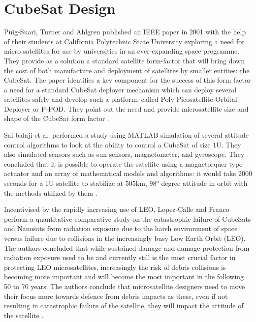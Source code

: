 \section{CubeSat Design}
Puig-Suari, Turner and Ahlgren published an IEEE paper in 2001 with the help of their students at California Polytechnic State University exploring a need for micro satellites for use by universities in an ever-expanding space programme. 
They provide as a solution a standard satellite form-factor that will bring down the cost of both manufacture and deployment of satellites by smaller entities: the CubeSat. 
The paper identifies a key component for the success of this form factor a need for a standard CubeSat deployer mechanism which can deploy several satellites safely and develop such a platform, called Poly Picosatellite Orbital Deployer or P-POD. 
They point out the need and provide microsatellite size and shape of the CubeSat form factor \cite{RefWorks:puig-suari2001development}.

Sai balaji et al. performed a study using MATLAB simulation of several attitude control algorithms to look at the ability to control a CubeSat of size 1U. 
They also simulated sensors such as sun sensors, magnetometer, and gyroscope. 
They concluded that it is possible to operate the satellite using a magnetorquer type actuator and an array of mathematical models and algorithms: it would take 2000 seconds for a 1U satellite to stabilize at 505km, 98° degree attitude in orbit with the methods utilized by them \cite{RefWorks:balaji2023studies}.

Incentivised by the rapidly increasing use of LEO, Lopez‑Calle and Franco perform a quantitative comparative study on the catastrophic failure of CubeSats and Nanosats from radiation exposure due to the harsh environment of space versus failure due to collisions in the increasingly busy Low Earth Orbit (LEO). 
The authors concluded that while sustained damage and damage protection from radiation exposure used to be and currently still is the most crucial factor in protecting LEO microsatellites, increasingly the risk of debris collisions is becoming more important and will become the most important in the following 50 to 70 years. 
The authors conclude that microsatellite designers need to move their focus more towards defence from debris impacts as these, even if not resulting in catastrophic failure of the satellite, they will impact the attitude of the satellite \cite{RefWorks:lopez-calle2023comparison}.